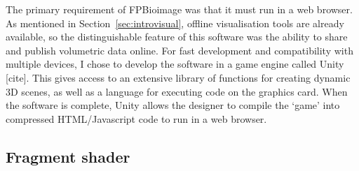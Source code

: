 The primary requirement of FPBioimage was that it must run in a web browser.
As mentioned in Section~\ref{sec:introvisual}, offline visualisation tools are already available, so the distinguishable feature of this software was the ability to share and publish volumetric data online.
For fast development and compatibility with multiple devices, I chose to develop the software in a game engine called Unity [cite].
This gives access to an extensive library of functions for creating dynamic 3D scenes, as well as a language for executing code on the graphics card.
When the software is complete, Unity allows the designer to compile the `game' into compressed HTML/Javascript code to run in a web browser.

\subsection{Fragment shader} \label{sec:shader}

